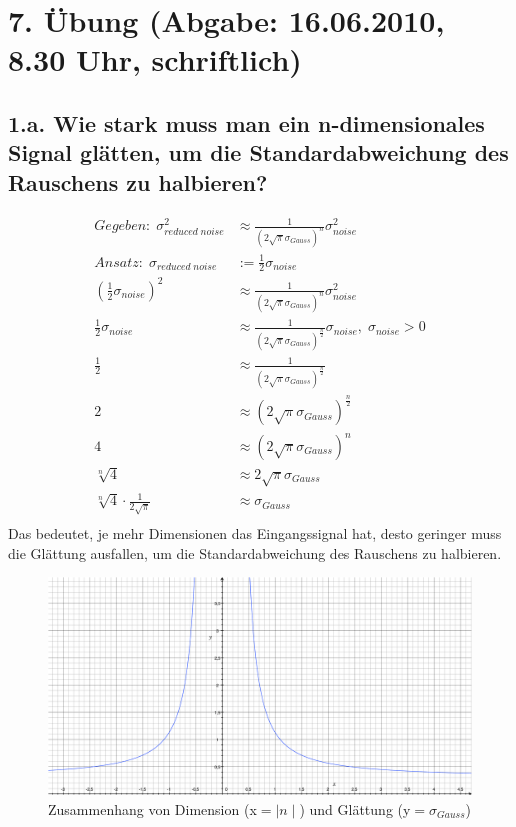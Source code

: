 \section*{7. \"Ubung (Abgabe: 16.06.2010, 8.30 Uhr, schriftlich)}

\subsection*{1.a. Wie stark muss man ein n-dimensionales Signal gl\"atten, um die Standardabweichung des Rauschens zu halbieren?}

\begin{align*}
Gegeben:\; \sigma_{reduced\;noise}^{2} &\approx \frac{1}{(2\sqrt{\pi}\sigma_{Gauss})^{n}} \sigma_{noise}^{2} \\
Ansatz:\; \sigma_{reduced\; noise} &:= \frac{1}{2}\sigma_{noise} \\
(\frac{1}{2}\sigma_{noise})^{2} &\approx \frac{1}{(2\sqrt{\pi}\sigma_{Gauss})^{n}} \sigma_{noise}^{2} \\
\frac{1}{2}\sigma_{noise} &\approx \frac{1}{(2\sqrt{\pi}\sigma_{Gauss})^{\frac{n}{2}}} \sigma_{noise},\; \sigma_{noise}>0 \\
\frac{1}{2} &\approx \frac{1}{(2\sqrt{\pi}\sigma_{Gauss})^{\frac{n}{2}}} \\
2 &\approx (2\sqrt{\pi}\sigma_{Gauss})^{\frac{n}{2}} \\
4 &\approx (2\sqrt{\pi}\sigma_{Gauss})^{n} \\
\sqrt[n]{4} &\approx 2\sqrt{\pi}\sigma_{Gauss} \\
\sqrt[n]{4}\cdot\frac{1}{2\sqrt{\pi}} &\approx \sigma_{Gauss} \\
\end{align*}
Das bedeutet, je mehr Dimensionen das Eingangssignal hat, desto geringer muss die Gl\"attung ausfallen, um die Standardabweichung des Rauschens zu halbieren.

\begin{figure}[!h] %
   \centering
   \includegraphics[height=0.17\textheight]{Uebung7/1_a.pdf} 
   \caption{Zusammenhang von Dimension (x$=\mid n \mid$) und Gl\"attung (y$=\sigma_{Gauss}$)}
   \label{fig:5.1}
\end{figure}

